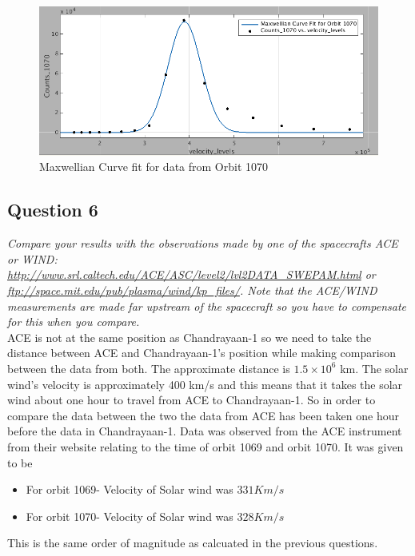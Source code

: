 \documentclass{article}
\begin{document}
\begin{figure}
\centering
\includegraphics[scale= 0.45]{Figures/curvefit_1070.png}
\caption{Maxwellian Curve fit for data from Orbit 1070}
\label{fig:curvefit_1070}
\end{figure}

\subsection{Question 6}
\textit{Compare your results with the observations made by one of the spacecrafts ACE or WIND: \url{http://www.srl.caltech.edu/ACE/ASC/level2/lvl2DATA_SWEPAM.html} or \url{ftp://space.mit.edu/pub/plasma/wind/kp_files/}. Note that the ACE/WIND measurements are made far upstream of the spacecraft so you have to compensate for this when you compare.}\\


ACE is not at the same position as Chandrayaan-1 so we need to take the distance between ACE and Chandrayaan-1's position while making comparison between the data from both. The approximate distance is $1.5\times10^6$ km. The solar wind’s velocity is approximately 400 km/s and this means that it takes the solar wind about one hour to travel from ACE to Chandrayaan-1. So in order to compare the data between the two the data from ACE has been taken one hour before the data in Chandrayaan-1.
Data was observed from the ACE instrument from their website relating to the time of orbit 1069 and orbit 1070. It was given to be
\begin{itemize}
\item {For orbit 1069- Velocity of Solar wind was $331 Km/s$}
\item {For orbit 1070- Velocity of Solar wind was $328 Km/s$}
\end{itemize}

This is the same order of magnitude as calcuated in the previous questions.

	
\clearpage
\end{document}
